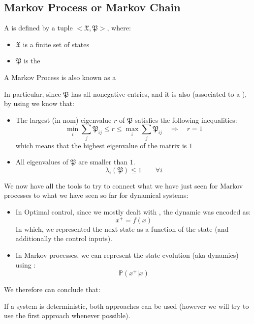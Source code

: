 \subsection{Markov Process or Markov Chain}

A  is defined by a tuple $<\mathfrak{X}, \mathfrak{P}>$, where:
\begin{itemize}
\item $\mathfrak{X}$ is a finite set of states
\item $\mathfrak{P}$ is the 
\end{itemize}
A Markov Process is also known as a 

In particular, since $\mathfrak{P}$ has all nonegative entries, and it is also  (associated to a ), by using  we know that:
\begin{itemize}
\item The largest (in nom) eigenvalue $r$ of $\mathfrak{P}$ satisfies the following inequalities:
\[\min_i \sum_j \mathfrak{P}_{ij}\le r\le\max_i \sum_{j}\mathfrak{P}_{ij}\quad\Rightarrow\quad r = 1\]
which means that the highest eigenvalue of the matrix is $1$
\item All eigenvalues of $\mathfrak{P}$ are smaller than $1$.
\[\lambda_i(\mathfrak{P})\le 1 \qquad \forall i\]
\end{itemize}

We now have all the tools to try to connect what we have just seen for Markov processes to what we have seen so far for dynamical systems:
\begin{itemize}
\item In Optimal control, since we mostly dealt with , the dynamic was encoded as:
\[x^+ = f(x)\]
In which, we represented the next state as a function of the state (and  additionally the control inputs).

\item In Markov processes, we can represent the state evolution (aka dynamics) using :
\[\mathbb{P}(x^+|x)\]
\end{itemize}
We therefore can conclude that: 

If a system is deterministic, both approaches can be used (however we will try to use the first approach whenever possible).

